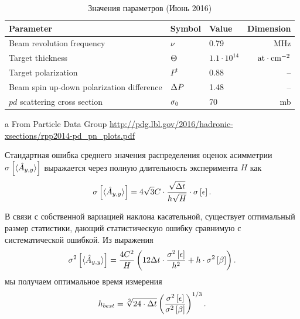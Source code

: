 \documentclass{article}
\begin{document}
	\begin{table}[h]
		\centering
		\caption{Значения параметров (Июнь 2016)\label{tbl:Param}}
		\begin{threeparttable}[h]
			\begin{tabular}{p{4.5cm}llr}
				\hline\hline
				Parameter                                 & Symbol            & Value              &               Dimension \\ \hline
				Beam revolution frequency                 & $\nu$             & 0.79               &                     MHz \\
				Target thickness                          & $\Thick$          & $1.1\cdot 10^{14}$ & $\mathrm{at\cdot cm^{-2}}$ \\
				Target polarization                       & $P^t$             & 0.88               &                      -- \\
				Beam spin up-down polarization difference & $\Delta P$             & 1.48               &                      -- \\
				$pd$ scattering cross section             & $\CS[0]$\tnote{a} & 70                 &                      mb \\ \hline
			\end{tabular}
			\begin{tablenotes}
				\item[a]{From Particle Data Group \url{http://pdg.lbl.gov/2016/hadronic-xsections/rpp2014-pd_pn_plots.pdf}}
			\end{tablenotes}
		\end{threeparttable}
	\end{table}
	
	Стандартная ошибка среднего значения распределения оценок асимметрии $\SE{\avg{\Ayy*}}$ выражается через полную длительность эксперимента $H$ как
	\begin{equation}\label{eq:AvgAyySEPhys}
	\SE{\avg{\Ayy*}} = 4\sqrt{3}C\cdot \frac{\sqrt{\Tint}}{h\sqrt{H}}\cdot\SE{\err}.
	\end{equation}
	
	В связи с собственной вариацией наклона касательной, существует оптимальный размер статистики, дающий статистическую ошибку сравнимую с систематической ошибкой. Из выражения
	\begin{equation}
		\v{\avg{\Ayy*}}	= \frac{4 C^2}{H}\bkt{12\Tint\cdot\frac{\v{\err}}{h^2} + h\cdot\v{\slp}}.
	\end{equation}
	мы получаем оптимальное время измерения
	\begin{equation}
	h_{best} = \sqrt[3]{24\cdot \Tint} \bkt{\frac{\v{\err}}{\v{\slp}}}^{1/3}.
	\end{equation}
	
\end{document}
